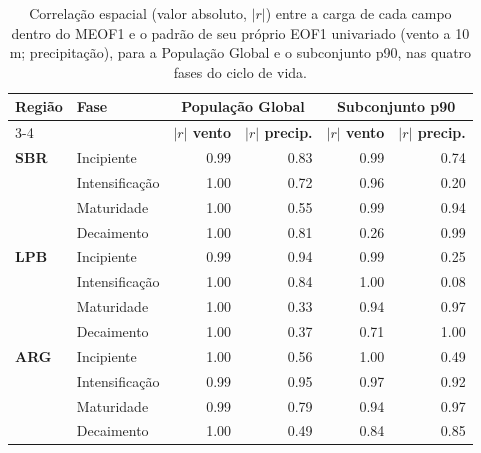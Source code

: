 \begin{table}[htbp]
\centering
\caption[Correlação espacial entre o MEOF1 e os EOF1 univariados (as quatro fases)]{Correlação espacial (valor absoluto, $|r|$) entre a carga de cada campo dentro do MEOF1 e o padrão de seu próprio EOF1 univariado (vento a 10 m; precipitação), para a População Global e o subconjunto p90, nas quatro fases do ciclo de vida.}
\label{tab:meof_bias_check_completa}
\begin{tabular*}{\textwidth}{@{\extracolsep{\fill}}llrrrr}
\hline
\textbf{Região} & \textbf{Fase} & \multicolumn{2}{c}{\textbf{População Global}} & \multicolumn{2}{c}{\textbf{Subconjunto p90}} \\
\cline{3-4} \cline{5-6}
 & & \textbf{$|r|$ vento} & \textbf{$|r|$ precip.} & \textbf{$|r|$ vento} & \textbf{$|r|$ precip.} \\
\hline
\textbf{SBR} & Incipiente & 0.99 & 0.83 & 0.99 & 0.74 \\
 & Intensificação & 1.00 & 0.72 & 0.96 & 0.20 \\
 & Maturidade & 1.00 & 0.55 & 0.99 & 0.94 \\
 & Decaimento & 1.00 & 0.81 & 0.26 & 0.99 \\
\hline
\textbf{LPB} & Incipiente & 0.99 & 0.94 & 0.99 & 0.25 \\
 & Intensificação & 1.00 & 0.84 & 1.00 & 0.08 \\
 & Maturidade & 1.00 & 0.33 & 0.94 & 0.97 \\
 & Decaimento & 1.00 & 0.37 & 0.71 & 1.00 \\
\hline
\textbf{ARG} & Incipiente & 1.00 & 0.56 & 1.00 & 0.49 \\
 & Intensificação & 0.99 & 0.95 & 0.97 & 0.92 \\
 & Maturidade & 0.99 & 0.79 & 0.94 & 0.97 \\
 & Decaimento & 1.00 & 0.49 & 0.84 & 0.85 \\
\hline
\end{tabular*}
\end{table}

